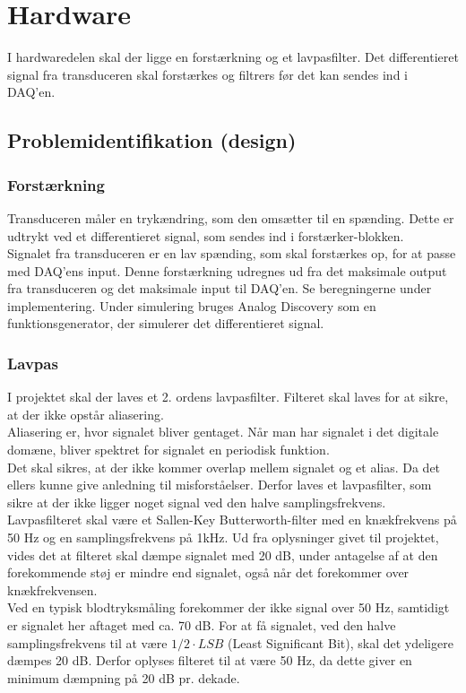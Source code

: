 \section{Hardware}
I hardwaredelen skal der ligge en forstærkning og et lavpasfilter. Det differentieret signal fra transduceren skal forstærkes og filtrers før det kan sendes ind i DAQ'en.

\subsection{Problemidentifikation (design)}
\subsubsection{Forstærkning}
Transduceren måler en trykændring, som den omsætter til en spænding. Dette er udtrykt ved et differentieret signal, som sendes ind i forstærker-blokken. \\
Signalet fra transduceren er en lav spænding, som skal forstærkes op, for at passe med DAQ'ens input. Denne forstærkning udregnes ud fra det maksimale output fra transduceren og det maksimale input til DAQ'en. Se beregningerne under implementering.  
\newline
Under simulering bruges Analog Discovery som en funktionsgenerator, der simulerer det differentieret signal.  

\subsubsection{Lavpas}
I projektet skal der laves et 2. ordens lavpasfilter. Filteret skal laves for at sikre, at der ikke opstår aliasering.\\
Aliasering \cite{DSB} er, hvor signalet bliver gentaget. Når man har signalet i det digitale domæne, bliver spektret for signalet en periodisk funktion.\\
Det skal sikres, at der ikke kommer overlap mellem signalet og et alias. Da det ellers kunne give anledning til misforståelser. Derfor laves et lavpasfilter, som sikre at der ikke ligger noget signal ved den halve samplingsfrekvens.\\
Lavpasfilteret skal være et Sallen-Key Butterworth-filter med en knækfrekvens på 50 Hz og en samplingsfrekvens på 1kHz. Ud fra oplysninger givet til projektet, vides det at filteret skal dæmpe signalet med 20 dB, under antagelse af at den forekommende støj er mindre end signalet, også når det forekommer over knækfrekvensen.\\
Ved en typisk blodtryksmåling forekommer der ikke signal over 50 Hz, samtidigt er signalet her aftaget med ca. 70 dB. For at få signalet, ved den halve samplingsfrekvens til at være $ 1/2 \cdot LSB $ (Least Significant Bit), skal det ydeligere dæmpes 20 dB. Derfor oplyses filteret til at være 50 Hz, da dette giver en minimum dæmpning på 20 dB pr. dekade.

